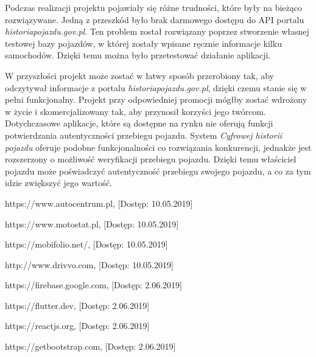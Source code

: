 \documentclass[12pt]{article}
\begin{document}
Podczas realizacji projektu pojawiały się różne trudności, które były na bieżąco rozwiązywane. Jedną z przeszkód było brak darmowego dostępu do API portalu \textit{historiapojazdu.gov.pl}. Ten problem został rozwiązany poprzez stworzenie własnej testowej bazy pojazdów, w której zostały wpisane ręcznie informacje kilku samochodów. Dzięki temu można było przetestować działanie aplikacji.

W przyszłości projekt może zostać w łatwy sposób przerobiony tak, aby odczytywał informacje z portalu \textit{historiapojazdu.gov.pl}, dzięki czemu stanie się w pełni funkcjonalny. Projekt przy odpowiedniej promocji mógłby zostać wdrożony w życie i skomercjalizowany tak, aby przynosił korzyści jego twórcom. Dotychczasowe aplikacje, które są dostępne na rynku nie oferują funkcji potwierdzania autentyczności przebiegu pojazdu. System \textit{Cyfrowej historii pojazdu} oferuje podobne funkcjonalności co rozwiązania konkurencji, jednakże jest rozszerzony o możliwość weryfikacji przebiegu pojazdu. Dzięki temu właściciel pojazdu może poświadczyć autentyczność przebiegu swojego pojazdu, a co za tym idzie zwiększyć jego wartość.


\newpage
\renewcommand\refname{Bibliografia}
\begin{thebibliography}{9}

  https://www.autocentrum.pl, [Dostęp: 10.05.2019]

  https://www.motostat.pl, [Dostęp: 10.05.2019]

 https://mobifolio.net/, [Dostęp: 10.05.2019]

  http://www.drivvo.com, [Dostęp: 10.05.2019]

  https://firebase.google.com, [Dostęp: 2.06.2019]

  https://flutter.dev, [Dostęp: 2.06.2019]

  https://reactjs.org, [Dostęp: 2.06.2019]

  https://getbootstrap.com, [Dostęp: 2.06.2019]
\end{thebibliography}
\end{document}
